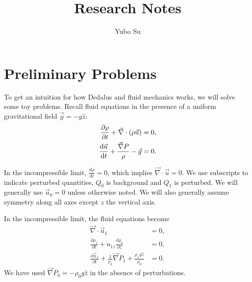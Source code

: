 \documentclass[11pt,
        usenames, %
        dvipsnames %
    ]{report}
\newcommand*{\rd}[2]{\frac{\mathrm{d}#1}{\mathrm{d}#2}}
\newcommand*{\pd}[2]{\frac{\partial#1}{\partial#2}}
\DeclarePairedDelimiter\p{\lparen}{\rparen}
\begin{document}
\def\Snospace~{\S{}} %
\renewcommand*{\sectionautorefname}{\Snospace}
\renewcommand*{\appendixautorefname}{\Snospace}
\renewcommand*{\figureautorefname}{Fig.}
\renewcommand*{\equationautorefname}{Eq.}
\renewcommand*{\tableautorefname}{Tab.}

\onehalfspacing

\pagestyle{fancy}
\cfoot{\thepage/\pageref{LastPage}}

\title{Research Notes}
\author{Yubo Su}
\rhead{}

\maketitle

\tableofcontents

\newpage

\chapter{Preliminary Problems}

To get an intuition for how Dedalus and fluid mechanics works, we will solve
some toy problems. Recall fluid equations in the presence of a uniform
gravitational field $\vec{g} = -g\hat{z}$:
\begin{equation}
    \begin{split}
        \pd{\rho}{t} + \vec{\nabla} \cdot \p*{\rho \vec{u}} &= 0,\\
        \rd{\vec{u}}{t} + \frac{\vec{\nabla}P}{\rho} - \vec{g} &= 0.
    \end{split}\label{eq:fluid_eq}
\end{equation}

In the incompressible limit, $\rd{\rho}{t} = 0$, which implies $\vec{\nabla}
\cdot \vec{u} = 0$. We use subscripts to indicate perturbed quantities, $Q_0$ is
background and $Q_1$ is perturbed. We will generally use $\vec{u}_0 = 0$ unless
otherwise noted. We will also generally assume symmetry along all axes except
$z$ the vertical axis.

In the incompressible limit, the fluid equations become
\begin{equation}
    \begin{split}
        \vec{\nabla} \cdot \vec{u}_1 &= 0,\\
        \pd{\rho_1}{t} + u_{1z}\pd{\rho_0}{z} &= 0,\\
        \pd{\vec{u}_1}{t} + \frac{1}{\rho_0}\vec{\nabla}P_1
            + \frac{\rho_1 g \hat{z}}{\rho_0} &= 0.
    \end{split}\label{eq:lin.incomp}
\end{equation}
We have used $\vec{\nabla}P_0 = -\rho_0 g \hat{z}$ in the absence of
perturbations.
\end{document}
